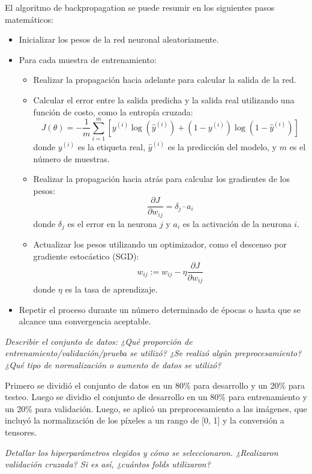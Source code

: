 \documentclass[11pt]{article}
\begin{document}
El algoritmo de backpropagation se puede resumir en los siguientes pasos matemáticos:
\begin{itemize}
    \item Inicializar los pesos de la red neuronal aleatoriamente.
    \item Para cada muestra de entrenamiento:
    \begin{itemize}
        \item Realizar la propagación hacia adelante para calcular la salida de la red.
        \item Calcular el error entre la salida predicha y la salida real utilizando una función de costo, como la entropía cruzada:
        \[
        J(\theta) = -\frac{1}{m} \sum_{i=1}^m \left[ y^{(i)} \log(\hat{y}^{(i)}) + (1 - y^{(i)}) \log(1 - \hat{y}^{(i)}) \right]
        \]
        donde \( y^{(i)} \) es la etiqueta real, \( \hat{y}^{(i)} \) es la predicción del modelo, y \( m \) es el número de muestras.
        \item Realizar la propagación hacia atrás para calcular los gradientes de los pesos:
        \[
        \frac{\partial J}{\partial w_{ij}} = \delta_j \cdot a_i
        \]
        donde \( \delta_j \) es el error en la neurona \( j \) y \( a_i \) es la activación de la neurona \( i \).
        \item Actualizar los pesos utilizando un optimizador, como el descenso por gradiente estocástico (SGD):
        \[
        w_{ij} := w_{ij} - \eta \frac{\partial J}{\partial w_{ij}}
        \]
        donde \( \eta \) es la tasa de aprendizaje.
    \end{itemize}
    \item Repetir el proceso durante un número determinado de épocas o hasta que se alcance una convergencia aceptable.
\end{itemize}


\textit{Describir el conjunto de datos: ¿Qué proporción de entrenamiento/validación/prueba se utilizó? ¿Se realizó algún preprocesamiento? ¿Qué tipo de normalización o aumento de datos se utilizó?}

Primero se dividió el conjunto de datos en un 80\% para desarrollo y un 20\% para testeo. Luego se dividio el conjunto de desarrollo en un 80\% para entrenamiento y un 20\% para validación. Luego, se aplicó un preprocesamiento a las imágenes, que incluyó la normalización de los píxeles a un rango de [0, 1] y la conversión a tensores. 

\textit{Detallar los hiperparámetros elegidos y cómo se seleccionaron. ¿Realizaron validación cruzada? Si es así, ¿cuántos folds utilizaron?}
\end{document}
